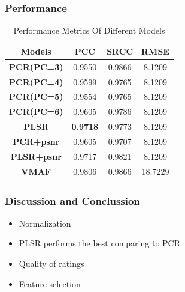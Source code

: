 \documentclass{beamer}
\begin{document}
\begin{frame}
\frametitle{Performance}
\begin{table}[!htbp]
	\centering
	\caption{Performance Metrics Of Different Models}
	\label{performance metrics}
	\begin{tabular}{|c|c|c|c|}
		\hline
		\textbf{Models} & \textbf{PCC} & \textbf{SRCC} &\textbf{RMSE}\\
		\hline
		\textbf{PCR(PC=3)} &  0.9550 &  0.9866 & 8.1209  \\
		\hline
		\textbf{PCR(PC=4)} &  0.9599 &  0.9765 & 8.1209  \\
		\hline
		\textbf{PCR(PC=5)} &  0.9554 &  0.9765 & 8.1209 \\
		\hline
		\textbf{PCR(PC=6)} &  0.9605 &  0.9786 & 8.1209  \\
		\hline
		\textbf{PLSR} &  \textbf{0.9718} &  0.9773 & 8.1209   \\
		\hline
		\textbf{PCR+psnr} &  0.9605 &  0.9707 & 8.1209  \\
		\hline
		\textbf{PLSR+psnr} &  0.9717 &  0.9821 & 8.1209  \\
		\hline
		\textbf{VMAF} &  0.9806 &  0.9866 & 18.7229  \\
		\hline
	\end{tabular} 
\end{table}
\end{frame} 

\begin{frame}
\frametitle{Discussion and Conclussion}

\begin{itemize}
	\item Normalization
	\item PLSR performs the best comparing to PCR
	\item Quality of ratings 
	\item Feature selection
\end{itemize}


\end{frame} 
\end{document}
